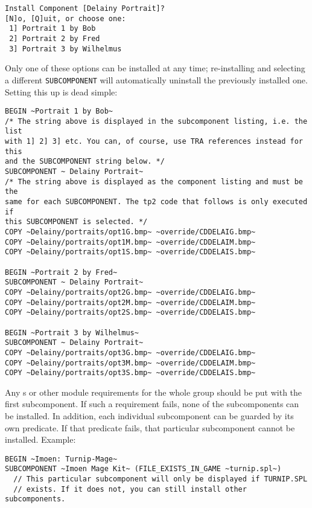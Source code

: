 \documentclass{article}
\def\ttref#1{\ahrefloc{#1}{\tt #1}}
\def\t#1{{\tt #1}}
\begin{document}
\begin{verbatim}
Install Component [Delainy Portrait]?
[N]o, [Q]uit, or choose one:
 1] Portrait 1 by Bob
 2] Portrait 2 by Fred
 3] Portrait 3 by Wilhelmus
\end{verbatim}

Only one of these options can be installed at any time; re-installing
and selecting a different \t{SUBCOMPONENT} will automatically uninstall the
previously installed one. Setting this up is dead simple:

\begin{verbatim}
BEGIN ~Portrait 1 by Bob~ 
/* The string above is displayed in the subcomponent listing, i.e. the list
with 1] 2] 3] etc. You can, of course, use TRA references instead for this
and the SUBCOMPONENT string below. */
SUBCOMPONENT ~ Delainy Portrait~
/* The string above is displayed as the component listing and must be the
same for each SUBCOMPONENT. The tp2 code that follows is only executed if
this SUBCOMPONENT is selected. */
COPY ~Delainy/portraits/opt1G.bmp~ ~override/CDDELAIG.bmp~
COPY ~Delainy/portraits/opt1M.bmp~ ~override/CDDELAIM.bmp~ 
COPY ~Delainy/portraits/opt1S.bmp~ ~override/CDDELAIS.bmp~

BEGIN ~Portrait 2 by Fred~ 
SUBCOMPONENT ~ Delainy Portrait~
COPY ~Delainy/portraits/opt2G.bmp~ ~override/CDDELAIG.bmp~
COPY ~Delainy/portraits/opt2M.bmp~ ~override/CDDELAIM.bmp~ 
COPY ~Delainy/portraits/opt2S.bmp~ ~override/CDDELAIS.bmp~

BEGIN ~Portrait 3 by Wilhelmus~ 
SUBCOMPONENT ~ Delainy Portrait~
COPY ~Delainy/portraits/opt3G.bmp~ ~override/CDDELAIG.bmp~
COPY ~Delainy/portraits/opt3M.bmp~ ~override/CDDELAIM.bmp~ 
COPY ~Delainy/portraits/opt3S.bmp~ ~override/CDDELAIS.bmp~
\end{verbatim}

Any \ttref{REQUIRE!FILE}s or other module requirements for the whole group
should be put with the first subcomponent. If such a requirement fails,
none of the subcomponents can be installed. In addition, each individual
subcomponent can be guarded by its own predicate. If that predicate fails,
that particular subcomponent cannot be installed. Example:

\begin{verbatim}
BEGIN ~Imoen: Turnip-Mage~
SUBCOMPONENT ~Imoen Mage Kit~ (FILE_EXISTS_IN_GAME ~turnip.spl~)
  // This particular subcomponent will only be displayed if TURNIP.SPL
  // exists. If it does not, you can still install other subcomponents.
\end{verbatim}
\end{document}

